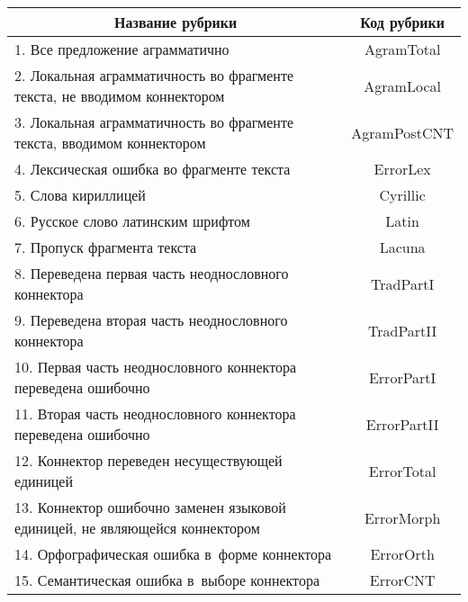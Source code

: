    \begin{table*}\small %
\begin{center}
\vspace*{2ex}

\begin{tabular}{|l|c|}
\hline
\multicolumn{1}{|c|}{Название рубрики}&Код рубрики\\ 
\hline
\hphantom{9}1. Все предложение аграмматично&AgramTotal\\
\hphantom{9}2. Локальная аграмматичность во фрагменте текста, не вводимом 
коннектором&AgramLocal\\ 
\hphantom{9}3. Локальная аграмматичность во фрагменте текста, вводимом 
коннектором&AgramPostCNT\\ 
\hphantom{9}4. Лексическая ошибка во фрагменте текста&ErrorLex\\ 
\hphantom{9}5. Слова кириллицей&Cyrillic\\ 
\hphantom{9}6. Русское слово латинским шрифтом&Latin\\ 
\hphantom{9}7. Пропуск фрагмента текста&Lacuna\\ 
\hphantom{9}8. Переведена первая часть неоднословного коннектора&TradPartI\\ 
\hphantom{9}9. Переведена вторая часть неоднословного коннектора&TradPartII\\ 
10. Первая часть неоднословного коннектора переведена ошибочно&ErrorPartI\\ 
11. Вторая часть неоднословного коннектора переведена ошибочно&ErrorPartII\\ 
12. Коннектор переведен несуществующей единицей&ErrorTotal\\ 
13. Коннектор ошибочно заменен языковой единицей, не являющейся 
коннектором&ErrorMorph\\ 
14. Орфографическая ошибка в~форме коннектора&ErrorOrth\\ 
15. Семантическая ошибка в~выборе коннектора&ErrorCNT\\ 
\hline 
\end{tabular} 
\end{center} 
\end{table*}

